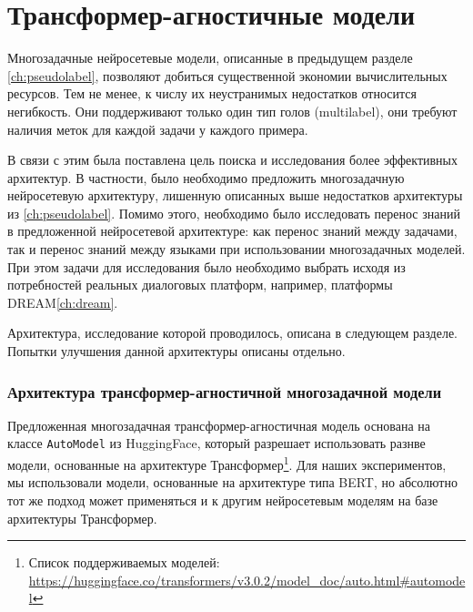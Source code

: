 \chapter{Трансформер-агностичные модели}\label{ch:tr-ag}
Многозадачные нейросетевые модели, описанные в предыдущем разделе \ref{ch:pseudolabel}, позволяют добиться существенной экономии вычислительных ресурсов. Тем не менее, к числу их неустранимых недостатков относится негибкость. Они поддерживают только один тип голов (multilabel), они требуют наличия меток для каждой задачи у каждого примера. 

В связи с этим была поставлена цель поиска и исследования более эффективных архитектур. В частности, было необходимо предложить многозадачную нейросетевую архитектуру, лишенную описанных выше недостатков архитектуры из \ref{ch:pseudolabel}. Помимо этого, необходимо было исследовать перенос знаний в предложенной нейросетевой архитектуре: как перенос знаний между задачами, так и перенос знаний между языками при использовании многозадачных моделей. При этом задачи для исследования было необходимо выбрать исходя из потребностей реальных диалоговых платформ, например, платформы DREAM\ref{ch:dream}. 

Архитектура, исследование которой проводилось, описана в следующем разделе. Попытки улучшения данной архитектуры описаны отдельно. 

\subsection{Архитектура трансформер-агностичной многозадачной модели}\label{ch:tr-ag:architecture} 
Предложенная многозадачная трансформер-агностичная модель основана на классе \texttt{AutoModel} из HuggingFace, который разрешает использовать разнве модели, основанные на архитектуре Трансформер\footnote{Список поддерживаемых моделей: \url{https://huggingface.co/transformers/v3.0.2/model_doc/auto.html\#automodel}}. Для наших экспериментов, мы использовали модели, основанные на архитектуре типа BERT, но абсолютно тот же подход может применяться и к другим нейросетевым моделям на базе архитектуры Трансформер. 

